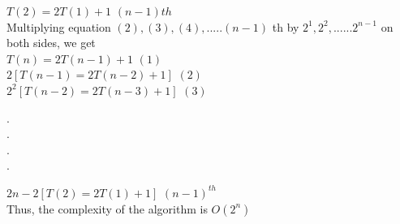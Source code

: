 \documentclass[9pt]{beamer}
\begin{document}
\begin{frame}
\hspace*{2cm} $T(2) = 2T(1) + 1$  \hspace*{3cm} $(n - 1)th$ \\

\vspace*{0.1cm}
Multiplying equation $(2), (3), (4), ..... (n - 1)$ th by $2^{1}, 2^{2}, ...... 2^{n - 1}$ on both sides, we get\\

\vspace*{0.1cm}
\hspace*{4cm} $T(n) = 2T(n - 1) + 1$   \hspace*{3cm}  $(1)$ \\
\hspace*{3cm} $2[T(n - 1) = 2T(n - 2) + 1]$ \hspace*{3cm}  $(2)$ \\
\hspace*{3cm} $2^{2}[T(n - 2) = 2T(n - 3) + 1]$ \hspace*{3cm}  $(3)$ \\
\begin{center}
  . \\
  . \\
  . \\
  . \\
\end{center}
\hspace*{2cm}  $2n - 2[T(2) = 2T(1) + 1]$  \hspace*{3cm} $(n - 1)^{th}$ \\

\vspace*{0.1cm}
Thus, the complexity of the algorithm is $O(2^{n})$ \\

\vspace*{0.4cm}
\end{frame}
\end{document}
